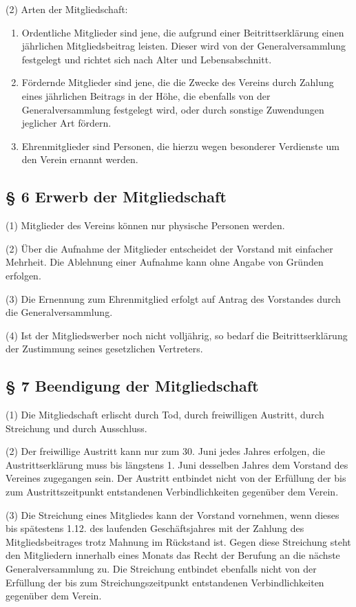 \documentclass[10pt,a4paper]{article}
\begin{document}
(2)
Arten der Mitgliedschaft:

\begin{enumerate}[label=\alph*)]
\item
Ordentliche Mitglieder sind jene, die aufgrund einer Beitrittserklärung einen jährlichen Mitgliedsbeitrag leisten.
Dieser wird von der Generalversammlung festgelegt und richtet sich nach Alter und Lebensabschnitt.
\item
Fördernde Mitglieder sind jene, die die Zwecke des Vereins durch Zahlung eines jährlichen Beitrags in der Höhe, die ebenfalls von der Generalversammlung festgelegt wird, oder durch sonstige Zuwendungen jeglicher Art fördern.
\item
Ehrenmitglieder sind Personen, die hierzu wegen besonderer Verdienste um den Verein ernannt werden.
\end{enumerate}

\subsection{§ 6
Erwerb der Mitgliedschaft}

(1)
Mitglieder des Vereins können nur physische Personen werden.

(2)
Über die Aufnahme der Mitglieder entscheidet der Vorstand mit einfacher Mehrheit.
Die Ablehnung einer Aufnahme kann ohne Angabe von Gründen erfolgen.

(3)
Die Ernennung zum Ehrenmitglied erfolgt auf Antrag des Vorstandes durch die Generalversammlung.

(4)
Ist der Mitgliedswerber noch nicht volljährig, so bedarf die Beitrittserklärung der Zustimmung seines gesetzlichen Vertreters.

\subsection{§ 7
Beendigung der Mitgliedschaft}

(1)
Die Mitgliedschaft erlischt durch Tod, durch freiwilligen Austritt, durch Streichung und durch Ausschluss.

(2)
Der freiwillige Austritt kann nur zum 30. Juni jedes Jahres erfolgen, die Austrittserklärung muss bis längstens 1. Juni desselben Jahres dem Vorstand des Vereines zugegangen sein.
Der Austritt entbindet nicht von der Erfüllung der bis zum Austrittszeitpunkt entstandenen Verbindlichkeiten gegenüber dem Verein.

(3)
Die Streichung eines Mitgliedes kann der Vorstand vornehmen, wenn dieses bis spätestens 1.12. des laufenden Geschäftsjahres mit der Zahlung des Mitgliedsbeitrages trotz Mahnung im Rückstand ist.
Gegen diese Streichung steht den Mitgliedern innerhalb eines Monats das Recht der Berufung an die nächste Generalversammlung zu.
Die Streichung entbindet ebenfalls nicht von der Erfüllung der bis zum Streichungszeitpunkt entstandenen Verbindlichkeiten gegenüber dem Verein.
\end{document}
